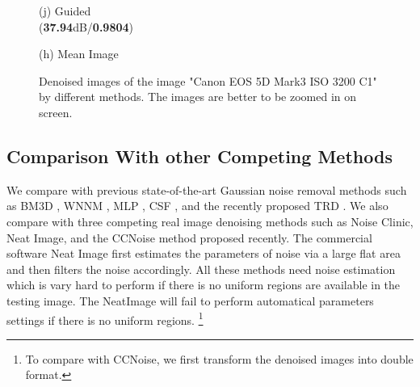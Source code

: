 \documentclass[10pt,twocolumn,letterpaper]{article}
\begin{document}
\begin{figure}
{\begin{minipage}[t]{0.195\textwidth}
{\footnotesize (j) Guided \\ (\textbf{37.94}dB/\textbf{0.9804})}
\end{minipage}
\begin{minipage}[t]{0.195\textwidth}
\centering
{}
{\footnotesize (h) Mean Image }
\end{minipage}
}
\caption{Denoised images of the image "Canon EOS 5D Mark3 ISO 3200 C1" by different methods. The images are better to be zoomed in on screen.}
\end{figure}


\subsection{Comparison With other Competing Methods}
We compare with previous state-of-the-art Gaussian noise removal methods such as BM3D \cite{bm3d}, WNNM \cite{wnnm}, MLP \cite{mlp}, CSF \cite{csf}, and the recently proposed TRD \cite{chen2015learning}. We also compare with three competing real image denoising methods such as Noise Clinic, Neat Image, and the CCNoise method proposed recently.  The commercial software Neat Image \cite{neatimage} first estimates the parameters of noise via a large flat area and then filters the noise accordingly. All these methods need noise estimation which is vary hard to perform if there is no uniform regions are available in the testing image. The NeatImage will fail to perform automatical parameters settings if there is no uniform regions. \footnote{To compare with CCNoise, we first transform the denoised images into double format.}
\end{document}
